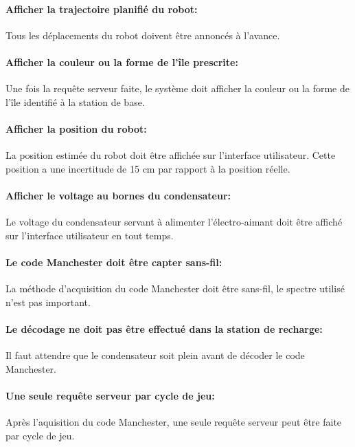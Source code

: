 \paragraph{Afficher la trajectoire planifié du robot:}
Tous les déplacements du robot doivent être annoncés à l'avance.

\paragraph{Afficher la couleur ou la forme de l'île prescrite:} Une fois la requête serveur faite, le système doit afficher la couleur ou la forme de l'île identifié à la station de base.

\paragraph{Afficher la position du robot:}
La position estimée du robot doit être affichée sur l'interface utilisateur. Cette position a une incertitude de 15 cm par rapport à la position réelle.

\paragraph{Afficher le voltage au bornes du condensateur:}
Le voltage du condensateur servant à alimenter l'électro-aimant doit être affiché sur l'interface utilisateur en tout temps.

\paragraph{Le code Manchester doit être capter sans-fil:}
La méthode d'acquisition du code Manchester doit être sans-fil, le spectre utilisé n'est pas important.

\paragraph{Le décodage ne doit pas être effectué dans la station de recharge:}

Il faut attendre que le condensateur soit plein avant de décoder le code Manchester.

\paragraph{Une seule requête serveur par cycle de jeu:}
Après l'aquisition du code Manchester, une seule requête serveur peut être faite par cycle de jeu.

